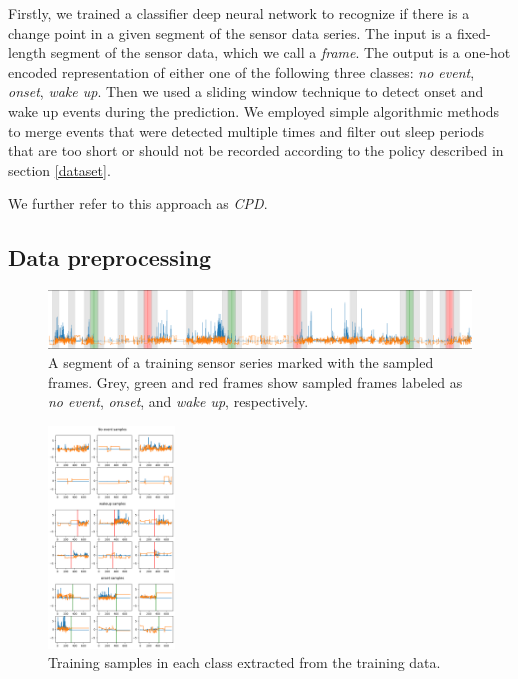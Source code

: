 \documentclass{article}
\begin{document}
Firstly, we trained a classifier deep neural network to recognize if there is a change point in a given segment of the sensor data series. The input is a fixed-length segment of the sensor data, which we call a \textit{frame}. The output is a one-hot encoded representation of either one of the following three classes: \textit{no event}, \textit{onset}, \textit{wake up}. Then we used a sliding window technique to detect onset and wake up events during the prediction. We employed simple algorithmic methods to merge events that were detected multiple times and filter out sleep periods that are too short or should not be recorded according to the policy described in section \ref{dataset}.

We further refer to this approach as \textit{CPD}.

\subsection{Data preprocessing}
\begin{figure}
    \centering
    \includegraphics[width=\textwidth]{cpd_sampling.png}
    \caption{A segment of a training sensor series marked with the sampled frames. Grey, green and red frames show sampled frames labeled as \textit{no event}, \textit{onset}, and \textit{wake up}, respectively.}
    \label{fig:cpd-sampling}
\end{figure}

\begin{figure}
    \includegraphics[width=0.3\textwidth]{cpd_samples.png}
    \caption{Training samples in each class extracted from the training data.}
    \label{fig:cpd-samples}
\end{figure}
\end{document}
